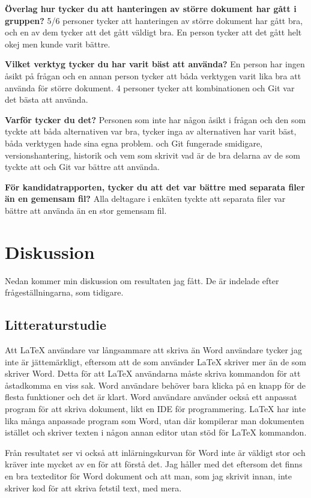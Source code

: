 \textbf{Överlag hur tycker du att hanteringen av större dokument har gått i gruppen?}
5/6 personer tycker att hanteringen av större dokument har gått bra, och en av dem tycker att det gått väldigt bra. En person tycker att det gått helt okej men kunde varit bättre.

\textbf{Vilket verktyg tycker du har varit bäst att använda?}
En person har ingen åsikt på frågan och en annan person tycker att båda verktygen varit lika bra att använda för större dokument. 4 personer tycker att kombinationen \latex och Git var det bästa att använda.

\textbf{Varför tycker du det?}
Personen som inte har någon åsikt i frågan och den som tyckte att båda alternativen var bra, tycker inga av alternativen har varit bäst, båda verktygen hade sina egna problem. \latex och Git fungerade smidigare, versionshantering, historik och vem som skrivit vad är de bra delarna av de som tyckte att \latex och Git var bättre att använda.

\textbf{För kandidatrapporten, tycker du att det var bättre med separata filer än en gemensam fil?}
Alla deltagare i enkäten tyckte att separata filer var bättre att använda än en stor gemensam fil.

\section{Diskussion}
\label{sec:discussion-tuhkala}
Nedan kommer min diskussion om resultaten jag fått. De är indelade efter frågeställningarna, som tidigare.

\subsection{Litteraturstudie}
Att LaTeX användare var långsammare att skriva än Word användare tycker jag inte är jättemärkligt, eftersom att de som använder LaTeX skriver mer än de som skriver Word. Detta för att LaTeX användarna måste skriva kommandon för att åstadkomma en viss sak. Word användare behöver bara klicka på en knapp för de flesta funktioner och det är klart. Word användare använder också ett anpassat program för att skriva dokument, likt en IDE för programmering. LaTeX har inte lika många anpassade program som Word, utan där kompilerar man dokumenten istället och skriver texten i någon annan editor utan stöd för LaTeX kommandon.

Från resultatet ser vi också att inlärningskurvan för Word inte är väldigt stor och kräver inte mycket av en för att förstå det. Jag håller med det eftersom det finns en bra texteditor för Word dokument och att man, som jag skrivit innan, inte skriver kod för att skriva fetstil text, med mera. 


